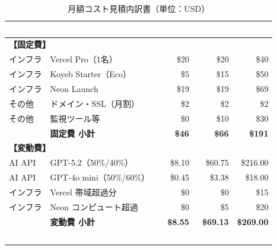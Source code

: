 \documentclass[a4paper,11pt]{ltjsarticle}
\begin{document}
\begin{table}[H]
\centering
\caption{月額コスト見積内訳書（単位：USD）}
\renewcommand{\arraystretch}{1.3}
\begin{tabular}{|l|l|r|r|r|}
\hline
\rowcolor{headerblue}\textcolor{white}{\textbf{分類}} & \textcolor{white}{\textbf{費目}} & \textcolor{white}{\textbf{小規模}} & \textcolor{white}{\textbf{中規模}} & \textcolor{white}{\textbf{大規模}} \\
\hline
\multicolumn{5}{|l|}{\cellcolor{lightblue}\textbf{【固定費】}} \\
\hline
インフラ & Vercel Pro（1名） & \$20 & \$20 & \$40 \\
\hline
インフラ & Koyeb Starter（Eco） & \$5 & \$15 & \$50 \\
\hline
インフラ & Neon Launch & \$19 & \$19 & \$69 \\
\hline
その他 & ドメイン・SSL（月割） & \$2 & \$2 & \$2 \\
\hline
その他 & 監視ツール等 & \$0 & \$10 & \$30 \\
\hline
\rowcolor{lightblue}
& \textbf{固定費 小計} & \textbf{\$46} & \textbf{\$66} & \textbf{\$191} \\
\hline
\multicolumn{5}{|l|}{\cellcolor{orange!15}\textbf{【変動費】}} \\
\hline
AI API & GPT-5.2（50\%/40\%） & \$8.10 & \$60.75 & \$216.00 \\
\hline
AI API & GPT-4o mini（50\%/60\%） & \$0.45 & \$3.38 & \$18.00 \\
\hline
インフラ & Vercel 帯域超過分 & \$0 & \$0 & \$15 \\
\hline
インフラ & Neon コンピュート超過 & \$0 & \$5 & \$20 \\
\hline
\rowcolor{orange!15}
& \textbf{変動費 小計} & \textbf{\$8.55} & \textbf{\$69.13} & \textbf{\$269.00} \\
\hline
\rowcolor{headerblue}
\multicolumn{2}{|l|}{\textcolor{white}{\textbf{月額コスト 合計}}} & \textcolor{white}{\textbf{\$54.55}} & \textcolor{white}{\textbf{\$135.13}} & \textcolor{white}{\textbf{\$460.00}} \\
\hline
\end{tabular}
\end{table}
\end{document}

